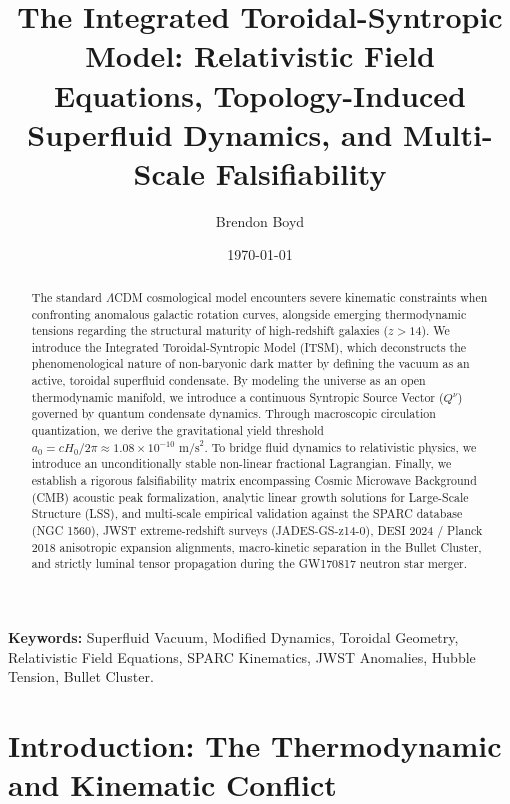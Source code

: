 \documentclass[aps,prd,onecolumn,linenumbers,superscriptaddress,nofootinbib]{revtex4-2}
\begin{document}
\title{The Integrated Toroidal-Syntropic Model: Relativistic Field Equations, Topology-Induced Superfluid Dynamics, and Multi-Scale Falsifiability}

\author{Brendon Boyd}

\date{\today}

\begin{abstract}
The standard $\Lambda$CDM cosmological model encounters severe kinematic constraints when confronting anomalous galactic rotation curves, alongside emerging thermodynamic tensions regarding the structural maturity of high-redshift galaxies ($z > 14$). We introduce the Integrated Toroidal-Syntropic Model (ITSM), which deconstructs the phenomenological nature of non-baryonic dark matter by defining the vacuum as an active, toroidal superfluid condensate. By modeling the universe as an open thermodynamic manifold, we introduce a continuous Syntropic Source Vector ($Q^\nu$) governed by quantum condensate dynamics. Through macroscopic circulation quantization, we derive the gravitational yield threshold $a_0 = c H_0 / 2\pi \approx 1.08 \times 10^{-10} \text{ m/s}^2$. To bridge fluid dynamics to relativistic physics, we introduce an unconditionally stable non-linear fractional Lagrangian. Finally, we establish a rigorous falsifiability matrix encompassing Cosmic Microwave Background (CMB) acoustic peak formalization, analytic linear growth solutions for Large-Scale Structure (LSS), and multi-scale empirical validation against the SPARC database (NGC 1560), JWST extreme-redshift surveys (JADES-GS-z14-0), DESI 2024 / Planck 2018 anisotropic expansion alignments, macro-kinetic separation in the Bullet Cluster, and strictly luminal tensor propagation during the GW170817 neutron star merger.
\end{abstract}

\maketitle

\textbf{Keywords:} Superfluid Vacuum, Modified Dynamics, Toroidal Geometry, Relativistic Field Equations, SPARC Kinematics, JWST Anomalies, Hubble Tension, Bullet Cluster.

\section{Introduction: The Thermodynamic and Kinematic Conflict}
\end{document}
